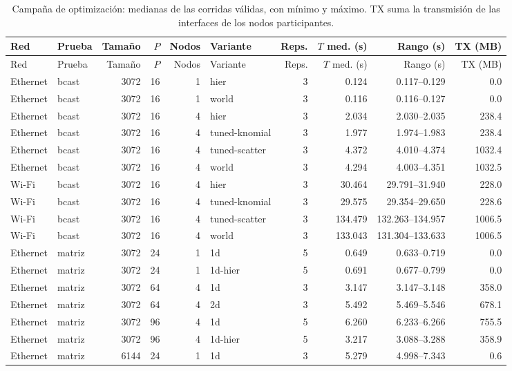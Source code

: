 \begin{longtable}{llrrrlrrrr}
\caption{Campaña de optimización: medianas de las corridas válidas, con mínimo y máximo. TX suma la transmisión de las interfaces de los nodos participantes.}\label{tab:opt-detalle}\\
\toprule Red & Prueba & Tamaño & $P$ & Nodos & Variante & Reps. & $T$ med. (s) & Rango (s) & TX (MB) \\
\midrule\endfirsthead
\toprule Red & Prueba & Tamaño & $P$ & Nodos & Variante & Reps. & $T$ med. (s) & Rango (s) & TX (MB) \\
\midrule\endhead
Ethernet & bcast & 3072 & 16 & 1 & hier & 3 & 0.124 & 0.117--0.129 & 0.0 \\
Ethernet & bcast & 3072 & 16 & 1 & world & 3 & 0.116 & 0.116--0.127 & 0.0 \\
Ethernet & bcast & 3072 & 16 & 4 & hier & 3 & 2.034 & 2.030--2.035 & 238.4 \\
Ethernet & bcast & 3072 & 16 & 4 & tuned-knomial & 3 & 1.977 & 1.974--1.983 & 238.4 \\
Ethernet & bcast & 3072 & 16 & 4 & tuned-scatter & 3 & 4.372 & 4.010--4.374 & 1032.4 \\
Ethernet & bcast & 3072 & 16 & 4 & world & 3 & 4.294 & 4.003--4.351 & 1032.5 \\
Wi-Fi & bcast & 3072 & 16 & 4 & hier & 3 & 30.464 & 29.791--31.940 & 228.0 \\
Wi-Fi & bcast & 3072 & 16 & 4 & tuned-knomial & 3 & 29.575 & 29.354--29.650 & 228.6 \\
Wi-Fi & bcast & 3072 & 16 & 4 & tuned-scatter & 3 & 134.479 & 132.263--134.957 & 1006.5 \\
Wi-Fi & bcast & 3072 & 16 & 4 & world & 3 & 133.043 & 131.304--133.633 & 1006.5 \\
Ethernet & matriz & 3072 & 24 & 1 & 1d & 5 & 0.649 & 0.633--0.719 & 0.0 \\
Ethernet & matriz & 3072 & 24 & 1 & 1d-hier & 5 & 0.691 & 0.677--0.799 & 0.0 \\
Ethernet & matriz & 3072 & 64 & 4 & 1d & 3 & 3.147 & 3.147--3.148 & 358.0 \\
Ethernet & matriz & 3072 & 64 & 4 & 2d & 3 & 5.492 & 5.469--5.546 & 678.1 \\
Ethernet & matriz & 3072 & 96 & 4 & 1d & 5 & 6.260 & 6.233--6.266 & 755.5 \\
Ethernet & matriz & 3072 & 96 & 4 & 1d-hier & 5 & 3.217 & 3.088--3.288 & 358.9 \\
Ethernet & matriz & 6144 & 24 & 1 & 1d & 3 & 5.279 & 4.998--7.343 & 0.6 \\

\end{longtable}
